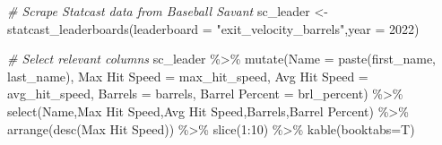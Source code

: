 \documentclass[
  11pt,
]{book}
\newenvironment{Shaded}{\begin{snugshade}}{\end{snugshade}}
\newcommand{\AttributeTok}[1]{\textcolor[rgb]{0.77,0.63,0.00}{#1}}
\newcommand{\CommentTok}[1]{\textcolor[rgb]{0.56,0.35,0.01}{\textit{#1}}}
\newcommand{\DecValTok}[1]{\textcolor[rgb]{0.00,0.00,0.81}{#1}}
\newcommand{\FunctionTok}[1]{\textcolor[rgb]{0.00,0.00,0.00}{#1}}
\newcommand{\NormalTok}[1]{#1}
\newcommand{\OtherTok}[1]{\textcolor[rgb]{0.56,0.35,0.01}{#1}}
\newcommand{\SpecialCharTok}[1]{\textcolor[rgb]{0.00,0.00,0.00}{#1}}
\newcommand{\StringTok}[1]{\textcolor[rgb]{0.31,0.60,0.02}{#1}}
\theoremstyle{definition}
\theoremstyle{definition}
\theoremstyle{definition}
\theoremstyle{definition}
\theoremstyle{remark}
\begin{document}
\begin{Shaded}
\begin{Highlighting}[]
\CommentTok{\# Scrape Statcast data from Baseball Savant}
\NormalTok{sc\_leader }\OtherTok{\textless{}{-}} \FunctionTok{statcast\_leaderboards}\NormalTok{(}\AttributeTok{leaderboard =} \StringTok{"exit\_velocity\_barrels"}\NormalTok{,}\AttributeTok{year =} \DecValTok{2022}\NormalTok{)}

\CommentTok{\# Select relevant columns}
\NormalTok{sc\_leader }\SpecialCharTok{\%\textgreater{}\%} 
  \FunctionTok{mutate}\NormalTok{(}\AttributeTok{Name =} \FunctionTok{paste}\NormalTok{(first\_name, last\_name),}
         \StringTok{\textasciigrave{}}\AttributeTok{Max Hit Speed}\StringTok{\textasciigrave{}} \OtherTok{=}\NormalTok{ max\_hit\_speed,}
         \StringTok{\textasciigrave{}}\AttributeTok{Avg Hit Speed}\StringTok{\textasciigrave{}} \OtherTok{=}\NormalTok{ avg\_hit\_speed,}
         \StringTok{\textasciigrave{}}\AttributeTok{Barrels}\StringTok{\textasciigrave{}} \OtherTok{=}\NormalTok{ barrels,}
         \StringTok{\textasciigrave{}}\AttributeTok{Barrel Percent}\StringTok{\textasciigrave{}} \OtherTok{=}\NormalTok{ brl\_percent) }\SpecialCharTok{\%\textgreater{}\%}
  \FunctionTok{select}\NormalTok{(Name,}\StringTok{\textasciigrave{}}\AttributeTok{Max Hit Speed}\StringTok{\textasciigrave{}}\NormalTok{,}\StringTok{\textasciigrave{}}\AttributeTok{Avg Hit Speed}\StringTok{\textasciigrave{}}\NormalTok{,}\StringTok{\textasciigrave{}}\AttributeTok{Barrels}\StringTok{\textasciigrave{}}\NormalTok{,}\StringTok{\textasciigrave{}}\AttributeTok{Barrel Percent}\StringTok{\textasciigrave{}}\NormalTok{) }\SpecialCharTok{\%\textgreater{}\%}
  \FunctionTok{arrange}\NormalTok{(}\FunctionTok{desc}\NormalTok{(}\StringTok{\textasciigrave{}}\AttributeTok{Max Hit Speed}\StringTok{\textasciigrave{}}\NormalTok{)) }\SpecialCharTok{\%\textgreater{}\%} \FunctionTok{slice}\NormalTok{(}\DecValTok{1}\SpecialCharTok{:}\DecValTok{10}\NormalTok{) }\SpecialCharTok{\%\textgreater{}\%} \FunctionTok{kable}\NormalTok{(}\AttributeTok{booktabs=}\NormalTok{T)}
\end{Highlighting}
\end{Shaded}
\end{document}
